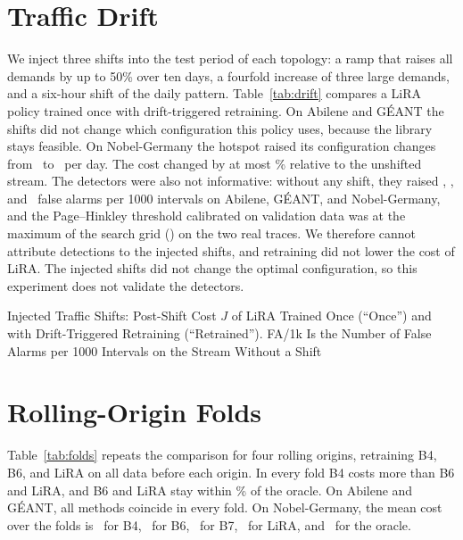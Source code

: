 \documentclass[preprint,12pt]{elsarticle}
\begin{document}
\section{Traffic Drift}\label{sec:res-drift}

We inject three shifts into the test period of each topology: a ramp that raises all demands by up to 50\% over ten days, a fourfold increase of three large demands, and a six-hour shift of the daily pattern. Table~\ref{tab:drift} compares a LiRA policy trained once with drift-triggered retraining. On Abilene and G\'{E}ANT the shifts did not change which configuration this policy uses, because the library stays feasible. On Nobel-Germany the hotspot raised its configuration changes from \driftNobSwNone\ to \driftNobSwHot\ per day. The cost changed by at most \driftMaxCostPct\% relative to the unshifted stream. The detectors were also not informative: without any shift, they raised \driftFaAbi, \driftFaGea, and \driftFaNob\ false alarms per 1000 intervals on Abilene, G\'{E}ANT, and Nobel-Germany, and the Page--Hinkley threshold calibrated on validation data was at the maximum of the search grid (\driftThrAbi) on the two real traces. We therefore cannot attribute detections to the injected shifts, and retraining did not lower the cost of LiRA. The injected shifts did not change the optimal configuration, so this experiment does not validate the detectors.




\begin{table}[h!]
\centering
\caption{Injected Traffic Shifts: Post-Shift Cost $J$ of LiRA Trained Once (``Once'') and with Drift-Triggered Retraining (``Retrained''). FA/1k Is the Number of False Alarms per 1000 Intervals on the Stream Without a Shift}
\label{tab:drift}
\footnotesize
\setlength{\tabcolsep}{3pt}
\begin{adjustbox}{max width=\linewidth}\end{adjustbox}
\end{table}


\section{Rolling-Origin Folds}\label{sec:res-folds}

Table~\ref{tab:folds} repeats the comparison for four rolling origins, retraining B4, B6, and LiRA on all data before each origin. In every fold B4 costs more than B6 and LiRA, and B6 and LiRA stay within \foldMaxGap\% of the oracle. On Abilene and G\'{E}ANT, all methods coincide in every fold. On Nobel-Germany, the mean cost over the folds is \foldNobBFour\ for B4, \foldNobBSix\ for B6, \foldNobBSeven\ for B7, \foldNobLiRA\ for LiRA, and \foldNobO\ for the oracle.
\end{document}

